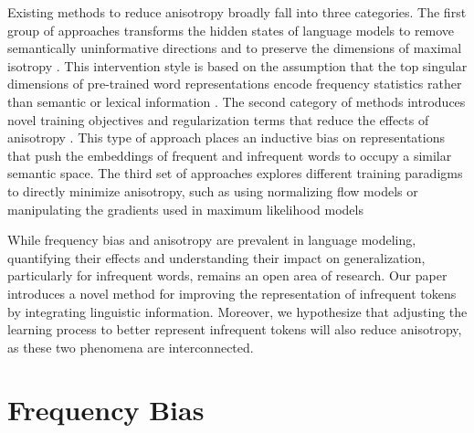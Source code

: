 Existing methods to reduce anisotropy broadly fall into three categories. The first group of approaches transforms the hidden states of language models to remove semantically uninformative directions and to preserve the dimensions of maximal isotropy \citep{arora2016simple, mu2018all, raunak2019effective, su2021whitening,bis2021too}. This intervention style is based on the assumption that the top singular dimensions of pre-trained word representations encode frequency statistics rather than semantic or lexical information \citep{mu2018all}. The second category of methods introduces novel training objectives and regularization terms that reduce the effects of anisotropy \citep{gong2018frage, gao2018representation, wang2019improving}. This type of approach places an inductive bias on representations that push the embeddings of frequent and infrequent words to occupy a similar semantic space. The third set of approaches explores different training paradigms to directly minimize anisotropy, such as using normalizing flow models \citep{li2020sentence} or manipulating the gradients used in maximum likelihood models \citep{yu2022rare}

\vspace{1em}

While frequency bias and anisotropy are prevalent in language modeling, quantifying their effects and understanding their impact on generalization, particularly for infrequent words, remains an open area of research. Our paper introduces a novel method for improving the representation of infrequent tokens by integrating linguistic information. Moreover, we hypothesize that adjusting the learning process to better represent infrequent tokens will also reduce anisotropy, as these two phenomena are interconnected.

\section{Frequency Bias}
\label{section:freq-bias}

